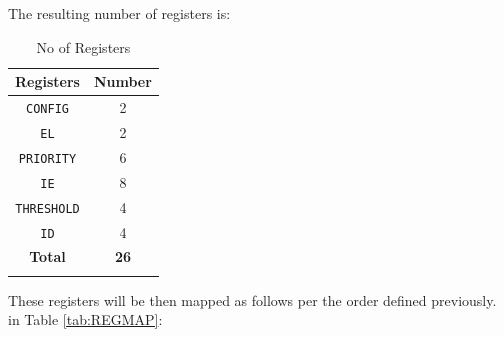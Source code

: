 The resulting number of registers is:

\begin{longtable}[c]{@{}cc@{}}	
		\toprule 
		\textbf{Registers} & \textbf{Number}\\
		\midrule 
		\endhead
		\texttt{CONFIG}    & 2\\
		\texttt{EL}        & 2\\
		\texttt{PRIORITY}  & 6\\
		\texttt{IE}        & 8\\
		\texttt{THRESHOLD} & 4\\
		\texttt{ID}        & 4\\
		\midrule
		\textbf{Total}     & \textbf{26}\\
		\bottomrule 	
	\caption{No of Registers}
	\label{tab:REGMAPNUM}
\end{longtable}

These registers will be then mapped as follows per the order defined 
\ifdefined\MARKDOWN
previously.
\else
in Table \ref{tab:REGMAP}:
\fi


